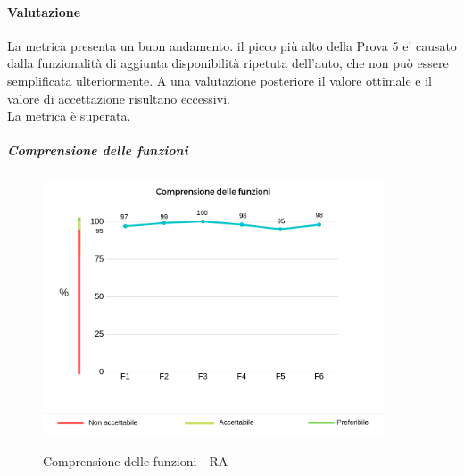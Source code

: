 	\paragraph*{Valutazione} La metrica presenta un buon andamento. il picco più  alto della Prova 5 e' causato dalla funzionalità  di aggiunta disponibilità  ripetuta dell'auto, che non può  essere semplificata ulteriormente. A una valutazione posteriore il valore ottimale e il valore di accettazione risultano eccessivi. 
	\\ La metrica è superata.
	\pagebreak
	\subparagraph{Comprensione delle funzioni}
	\begin{center}
		\begin{figure}[h] 
			\centering 
			\includegraphics[width=0.90\textwidth]{res/images/new/comprensioneFunzioni.png}\\
			\caption{Comprensione delle funzioni - RA}
		\end{figure}
	\end{center}
